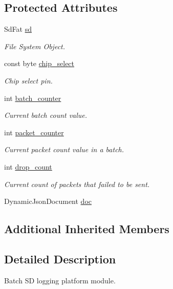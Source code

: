 \subsection*{Protected Attributes}
\begin{DoxyCompactItemize}
\item 
Sd\+Fat \hyperlink{class_loom___batch_s_d_a26a8fecb120202e86c5c884d055ad8ae}{sd}
\begin{DoxyCompactList}\small\item\em File System Object. \end{DoxyCompactList}\item 
const byte \hyperlink{class_loom___batch_s_d_abe9e47bc3e511e89056b2da32f580eed}{chip\+\_\+select}
\begin{DoxyCompactList}\small\item\em Chip select pin. \end{DoxyCompactList}\item 
int \hyperlink{class_loom___batch_s_d_aac325ca5667cd8d81409072f890be678}{batch\+\_\+counter}
\begin{DoxyCompactList}\small\item\em Current batch count value. \end{DoxyCompactList}\item 
int \hyperlink{class_loom___batch_s_d_af26d1091a8d6368edbf1456d016c0b78}{packet\+\_\+counter}
\begin{DoxyCompactList}\small\item\em Current packet count value in a batch. \end{DoxyCompactList}\item 
int \hyperlink{class_loom___batch_s_d_a24ec8915a5e1789b64e1593e6215982a}{drop\+\_\+count}
\begin{DoxyCompactList}\small\item\em Current count of packets that failed to be sent. \end{DoxyCompactList}\item 
Dynamic\+Json\+Document \hyperlink{class_loom___batch_s_d_a06ca96fe43ddf77a2f20ca2877be7e85}{doc}
\end{DoxyCompactItemize}
\subsection*{Additional Inherited Members}


\subsection{Detailed Description}
Batch SD logging platform module. 

